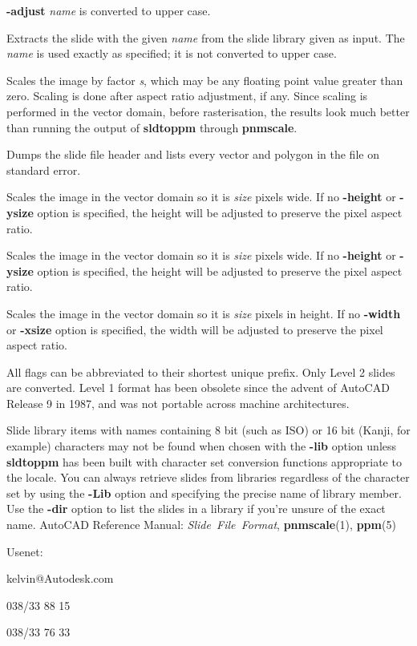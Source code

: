 \begin{TPlist}{{\bf -adjust}}
{\it name}
is converted to upper case.
\item[{{\bf -Lib}{\it \ name}
}]
Extracts the slide with the given
{\it name}
from the slide library given as input.  The
{\it name}
is used exactly as specified; it is not converted to upper case.
\item[{{\bf -scale}{\it \ s}
}]
Scales the image by factor
{\it s}{\rm ,}
which may be any floating point value greater than zero.  Scaling is
done after aspect ratio adjustment, if any.  Since scaling is
performed in the vector domain, before rasterisation, the results look
much better than running the output of
{\bf sldtoppm}
through
{\bf pnmscale}{\rm .}
\item[{{\bf -verbose}}]
Dumps the slide file header and lists every vector and polygon in the
file on standard error.
\item[{{\bf -width}{\it \ size}
}]
Scales the image in the vector domain so it is
{\it size}
pixels wide.  If no
{\bf -height}
or
{\bf -ysize}
option is specified, the height will be adjusted to preserve the
pixel aspect ratio. 
\item[{{\bf -xsize}{\it \ size}
}]
Scales the image in the vector domain so it is
{\it size}
pixels wide.  If no
{\bf -height}
or
{\bf -ysize}
option is specified, the height will be adjusted to preserve the
pixel aspect ratio. 
\item[{{\bf -ysize}{\it \ size}
}]
Scales the image in the vector domain so it is
{\it size}
pixels in height.  If no
{\bf -width}
or
{\bf -xsize}
option is specified, the width will be adjusted to preserve the
pixel aspect ratio. 
\end{TPlist}

\par
All flags can be abbreviated to their shortest unique prefix.
Only Level 2 slides are converted.  Level 1 format has been obsolete
since the advent of AutoCAD Release 9 in 1987, and was not portable
across machine architectures.
\par
Slide library items with names containing 8 bit (such as ISO) or 16
bit (Kanji, for example) characters may not be found when chosen with the
{\bf -lib}
option unless
{\bf sldtoppm}
has been built with character set conversion functions appropriate to
the locale.  You can always retrieve slides from libraries regardless
of the character set by using the
{\bf -Lib}
option and specifying the precise name of library member.  Use the
{\bf -dir}
option to list the slides in a library if you're unsure of the
exact name.
AutoCAD Reference Manual:
{\it Slide\ File\ Format}{\rm ,}
{\bf pnmscale}{\rm (1),}
{\bf ppm}{\rm (5)}
\begin{TPlist}{Usenet:}
\item[{Usenet:}]
kelvin@Autodesk.com
\item[{Fax:}]
038/33 88 15
\item[{Voice:}]
038/33 76 33
\end{TPlist}

